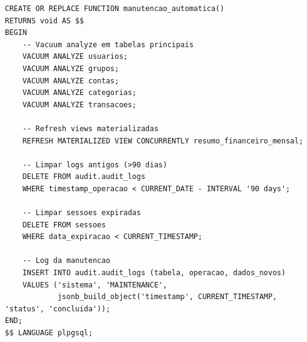 \begin{lstlisting}[caption=Funcao para manutencao automatica]
CREATE OR REPLACE FUNCTION manutencao_automatica()
RETURNS void AS $$
BEGIN
    -- Vacuum analyze em tabelas principais
    VACUUM ANALYZE usuarios;
    VACUUM ANALYZE grupos;
    VACUUM ANALYZE contas;
    VACUUM ANALYZE categorias;
    VACUUM ANALYZE transacoes;
    
    -- Refresh views materializadas
    REFRESH MATERIALIZED VIEW CONCURRENTLY resumo_financeiro_mensal;
    
    -- Limpar logs antigos (>90 dias)
    DELETE FROM audit.audit_logs 
    WHERE timestamp_operacao < CURRENT_DATE - INTERVAL '90 days';
    
    -- Limpar sessoes expiradas
    DELETE FROM sessoes 
    WHERE data_expiracao < CURRENT_TIMESTAMP;
    
    -- Log da manutencao
    INSERT INTO audit.audit_logs (tabela, operacao, dados_novos)
    VALUES ('sistema', 'MAINTENANCE', 
            jsonb_build_object('timestamp', CURRENT_TIMESTAMP, 'status', 'concluida'));
END;
$$ LANGUAGE plpgsql;
\end{lstlisting}
